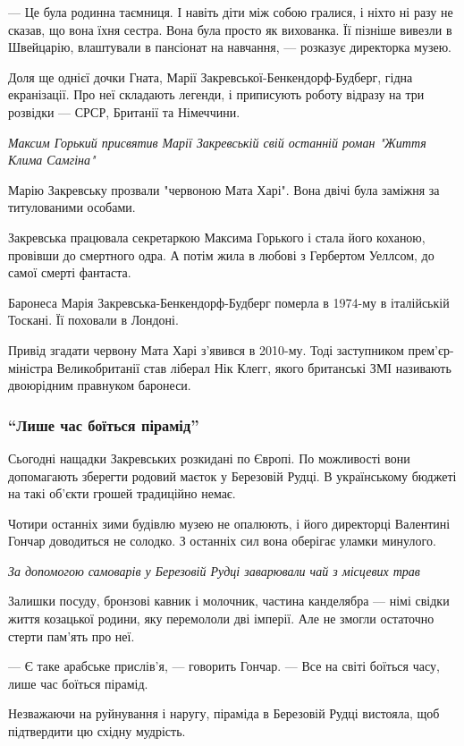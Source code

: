 --- Це була родинна таємниця. І навіть діти між собою гралися, і ніхто ні разу не
сказав, що вона їхня сестра. Вона була просто як вихованка. Її пізніше вивезли
в Швейцарію, влаштували в пансіонат на навчання, --- розказує директорка музею.

Доля ще однієї дочки Гната, Марії Закревської-Бенкендорф-Будберг, гідна
екранізації. Про неї складають легенди, і приписують роботу відразу на три
розвідки --- СРСР, Британії та Німеччини.

\emph{Максим Горький присвятив Марії Закревській свій останній роман "Життя Клима Самгіна"}

Марію Закревську прозвали "червоною Мата Харі". Вона двічі була заміжня за титулованими особами.

Закревська працювала секретаркою Максима Горького і стала його коханою,
провівши до смертного одра. А потім жила в любові з Гербертом Уеллсом, до самої
смерті фантаста.

Баронеса Марія Закревська-Бенкендорф-Будберг померла в 1974-му в італійській
Тоскані. Її поховали в Лондоні.

Привід згадати червону Мата Харі з'явився в 2010-му. Тоді заступником
прем'єр-міністра Великобританії став ліберал Нік Клегг, якого британські ЗМІ
називають двоюрідним правнуком баронеси.

\subsubsection{``Лише час боїться пірамід''}

Сьогодні нащадки Закревських розкидані по Європі. По можливості вони
допомагають зберегти родовий маєток у Березовій Рудці. В українському бюджеті
на такі об'єкти грошей традиційно немає.

Чотири останніх зими будівлю музею не опалюють, і його директорці Валентині
Гончар доводиться не солодко. З останніх сил вона оберігає уламки минулого.

\emph{За допомогою самоварів у Березовій Рудці заварювали чай з місцевих трав}

Залишки посуду, бронзові кавник і молочник, частина канделябра --- німі свідки життя козацької родини, яку перемололи дві імперії. Але не змогли остаточно стерти пам'ять про неї.

--- Є таке арабське прислів’я, --- говорить Гончар. --- Все на світі боїться часу, лише час боїться пірамід.

Незважаючи на руйнування і наругу, піраміда в Березовій Рудці вистояла, щоб підтвердити цю східну мудрість.


